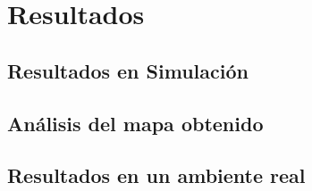 \chapter{Resultados}


\section{Resultados en Simulaci\'on}


\section{An\'alisis del mapa obtenido}


\section{Resultados en un ambiente real}